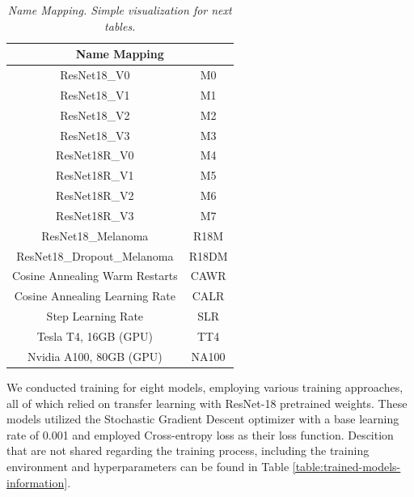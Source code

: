 \begin{table}[H]
  \centering
  \begin{tabular}{cc}
    \toprule

    \multicolumn{2}{c}{\textbf{Name Mapping}} \\
    \midrule
    ResNet18\_V0 & M0 \\
    ResNet18\_V1 & M1 \\
    ResNet18\_V2 & M2 \\
    ResNet18\_V3 & M3 \\
    ResNet18R\_V0  & M4 \\
    ResNet18R\_V1  & M5 \\
    ResNet18R\_V2 & M6 \\
    ResNet18R\_V3  & M7 \\
    ResNet18\_Melanoma & R18M \\
    ResNet18\_Dropout\_Melanoma & R18DM \\
    Cosine Annealing Warm Restarts & CAWR \\
    Cosine Annealing Learning Rate & CALR \\
    Step Learning Rate & SLR \\
    Tesla T4, 16GB (GPU) & TT4 \\
    Nvidia A100, 80GB (GPU) & NA100 \\
    \bottomrule
  \end{tabular}
  \caption[Name Mapping]
  {\textit{Name Mapping. Simple visualization for next tables.
  }}
  {\label{table:mapping-names}}
\end{table}

We conducted training for eight models, employing various training approaches,
all of which relied on transfer learning with ResNet-18 pretrained weights.
These models utilized the Stochastic Gradient Descent optimizer with a base
learning rate of 0.001 and employed Cross-entropy loss as their loss function.
Descition that are not shared regarding the training process, including the
training environment and hyperparameters can be found in
Table \ref{table:trained-models-information}.

\newpage

